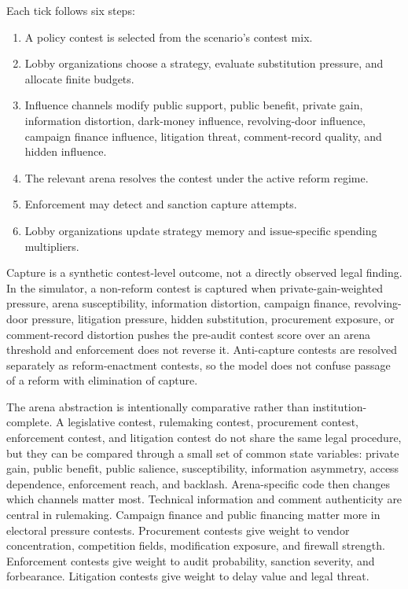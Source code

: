 Each tick follows six steps:

\begin{enumerate}
  \item A policy contest is selected from the scenario's contest mix.
  \item Lobby organizations choose a strategy, evaluate substitution pressure, and allocate finite budgets.
  \item Influence channels modify public support, public benefit, private gain, information distortion, dark-money influence, revolving-door influence, campaign finance influence, litigation threat, comment-record quality, and hidden influence.
  \item The relevant arena resolves the contest under the active reform regime.
  \item Enforcement may detect and sanction capture attempts.
  \item Lobby organizations update strategy memory and issue-specific spending multipliers.
\end{enumerate}

Capture is a synthetic contest-level outcome, not a directly observed legal finding. In the simulator, a non-reform contest is captured when private-gain-weighted pressure, arena susceptibility, information distortion, campaign finance, revolving-door pressure, litigation pressure, hidden substitution, procurement exposure, or comment-record distortion pushes the pre-audit contest score over an arena threshold and enforcement does not reverse it. Anti-capture contests are resolved separately as reform-enactment contests, so the model does not confuse passage of a reform with elimination of capture.

The arena abstraction is intentionally comparative rather than institution-complete. A legislative contest, rulemaking contest, procurement contest, enforcement contest, and litigation contest do not share the same legal procedure, but they can be compared through a small set of common state variables: private gain, public benefit, public salience, susceptibility, information asymmetry, access dependence, enforcement reach, and backlash. Arena-specific code then changes which channels matter most. Technical information and comment authenticity are central in rulemaking. Campaign finance and public financing matter more in electoral pressure contests. Procurement contests give weight to vendor concentration, competition fields, modification exposure, and firewall strength. Enforcement contests give weight to audit probability, sanction severity, and forbearance. Litigation contests give weight to delay value and legal threat.

